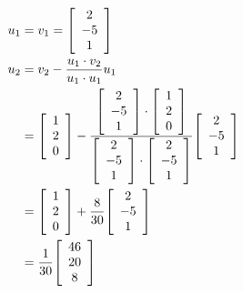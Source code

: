 \documentclass[11pt, a4paper, norsk]{NTNUoving}
\newenvironment{matrise}[1][c]{
        \left[
            \begin{array}{#1}
    }
    {    
    \end{array}
    \right]           
}
\begin{document}
\begin{oppgave}
    \begin{punkt}
        \begin{align*}
            u_1 &=v_1 = \begin{matrise}[c]2\\-5\\1\end{matrise}\\
            u_2 &=v_2-\frac{u_1\cdot v_2}{u_1 \cdot u_1}u_1
             \\ &=\begin{matrise}[c]1\\2\\0\end{matrise}-\frac{\begin{matrise}[c]2\\-5\\1\end{matrise}\cdot \begin{matrise}[c]1\\2\\0\end{matrise}}{\begin{matrise}[c]2\\-5\\1\end{matrise} \cdot \begin{matrise}[c]2\\-5\\1\end{matrise}}\begin{matrise}[c]2\\-5\\1\end{matrise}
             \\&=\begin{matrise}[c]1\\2\\0\end{matrise}+\frac{8}{30}\begin{matrise}[c]2\\-5\\1\end{matrise}
             \\&=\frac{1}{30}\begin{matrise}[c]46\\20\\8\end{matrise}
        \end{align*}
    \end{punkt}

\end{oppgave}
\end{document}
